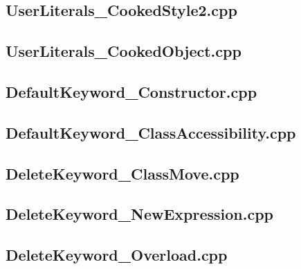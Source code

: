 \documentclass[11pt]{report}
\begin{document}
\begin{appendix}
\subsection{UserLiterals\_CookedStyle2.cpp}
\label{UserLiterals_CookedStyle2}


\subsection{UserLiterals\_CookedObject.cpp}
\label{UserLiterals_CookedObject}


\subsection{DefaultKeyword\_Constructor.cpp}
\label{DefaultKeyword_Constructor}


\subsection{DefaultKeyword\_ClassAccessibility.cpp}
\label{DefaultKeyword_ClassAccessibility}


\subsection{DeleteKeyword\_ClassMove.cpp}
\label{DeleteKeyword_ClassMove}


\subsection{DeleteKeyword\_NewExpression.cpp}
\label{DeleteKeyword_NewExpression}


\subsection{DeleteKeyword\_Overload.cpp}
\label{DeleteKeyword_Overload}



\end{appendix}
\end{document}
